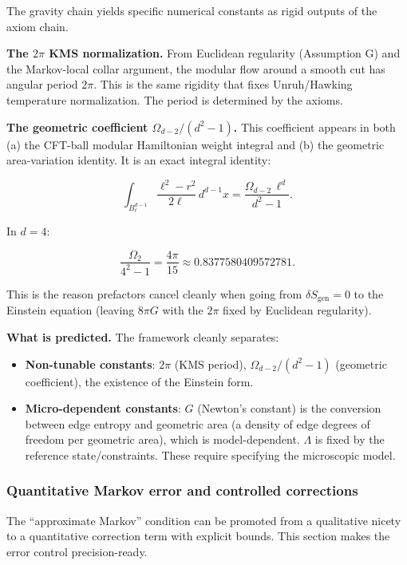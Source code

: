 \documentclass[11pt,a4paper]{article}
\theoremstyle{remark}
\providecommand{\tightlist}{%
  \setlength{\itemsep}{0pt}\setlength{\parskip}{0pt}}
\begin{document}
The gravity chain yields specific numerical constants as rigid outputs of
the axiom chain.

\textbf{The \(2\pi\) KMS normalization.} From Euclidean regularity (Assumption G)
and the Markov-local collar argument, the modular flow around a smooth cut
has angular period \(2\pi\). This is the same rigidity that fixes Unruh/Hawking
temperature normalization. The period is determined by the axioms.

\textbf{The geometric coefficient \(\Omega_{d-2}/(d^2 - 1)\).} This coefficient
appears in both (a) the CFT-ball modular Hamiltonian weight integral and
(b) the geometric area-variation identity. It is an exact integral identity:

\[
\int_{B^{d-1}_\ell} \frac{\ell^2 - r^2}{2\ell} \, d^{d-1}x
= \frac{\Omega_{d-2} \, \ell^d}{d^2 - 1}.
\]

In \(d = 4\):

\[
\frac{\Omega_2}{4^2 - 1} = \frac{4\pi}{15} \approx 0.8377580409572781.
\]

This is the reason prefactors cancel cleanly when going from
\(\delta S_{\mathrm{gen}} = 0\) to the Einstein equation (leaving \(8\pi G\)
with the \(2\pi\) fixed by Euclidean regularity).

\textbf{What is predicted.} The framework cleanly separates:

\begin{itemize}
\tightlist
\item
  \textbf{Non-tunable constants}: \(2\pi\) (KMS period), \(\Omega_{d-2}/(d^2-1)\)
  (geometric coefficient), the existence of the Einstein form.
\item
  \textbf{Micro-dependent constants}: \(G\) (Newton's constant) is the conversion
  between edge entropy and geometric area (a density of edge degrees of
  freedom per geometric area), which is model-dependent. \(\Lambda\) is fixed
  by the reference state/constraints. These require specifying the
  microscopic model.
\end{itemize}

\subsubsection{Quantitative Markov error and controlled corrections}\label{quantitative-markov-error-and-controlled-corrections}

The ``approximate Markov'' condition can be promoted from a qualitative nicety to
a quantitative correction term with explicit bounds. This section makes the
error control precision-ready.
\end{document}
